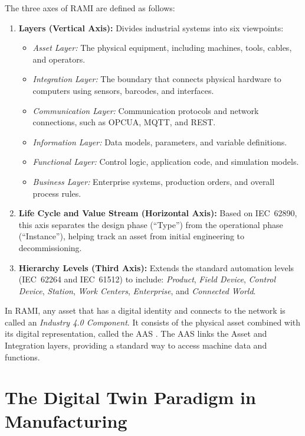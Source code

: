 The three axes of \gls{RAMI} are defined as follows:
\begin{enumerate}
    \item \textbf{Layers (Vertical Axis):} Divides industrial systems into six viewpoints:
    \begin{itemize}
        \item \textit{Asset Layer:} The physical equipment, including machines, tools, cables, and operators.
        \item \textit{Integration Layer:} The boundary that connects physical hardware to computers using sensors, barcodes, and interfaces.
        \item \textit{Communication Layer:} Communication protocols and network connections, such as \gls{OPCUA}, \gls{MQTT}, and \gls{REST}.
        \item \textit{Information Layer:} Data models, parameters, and variable definitions.
        \item \textit{Functional Layer:} Control logic, application code, and simulation models.
        \item \textit{Business Layer:} Enterprise systems, production orders, and overall process rules.
    \end{itemize}
    
    \item \textbf{Life Cycle and Value Stream (Horizontal Axis):} Based on \gls{IEC}~62890, this axis separates the design phase (``Type'') from the operational phase (``Instance''), helping track an asset from initial engineering to decommissioning.
    
    \item \textbf{Hierarchy Levels (Third Axis):} Extends the standard automation levels (\gls{IEC}~62264 and \gls{IEC}~61512) to include: \textit{Product}, \textit{Field Device}, \textit{Control Device}, \textit{Station}, \textit{Work Centers}, \textit{Enterprise}, and \textit{Connected World}.
\end{enumerate}

In \gls{RAMI}, any asset that has a digital identity and connects to the network is called an \textit{Industry 4.0 Component}. It consists of the physical asset combined with its digital representation, called the \gls{AAS} \cite{Abdel-Aty2022,Pajpach2025}. The \gls{AAS} links the Asset and Integration layers, providing a standard way to access machine data and functions.

\section{The Digital Twin Paradigm in Manufacturing}
\label{sec:dt_paradigm}

